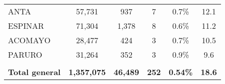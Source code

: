 \begin{tabular}{lccccc}
	\cellcolor[HTML]{FFFF99}ANTA                                    & 57,731               & 937                                  & 7                    & 0.7\%                      & 12.1                                        \\
	\cellcolor[HTML]{FFFF99}ESPINAR                                 & 71,304               & 1,378                                & 8                    & 0.6\%                      & 11.2                                        \\
	\cellcolor[HTML]{FFFF99}ACOMAYO                                 & 28,477               & 424                                  & 3                    & 0.7\%                      & 10.5                                        \\
	\cellcolor[HTML]{FFFF99}PARURO                                  & 31,264               & 352                                  & 3                    & 0.9\%                      & 9.6                                         \\
	& \multicolumn{1}{l}{} & \multicolumn{1}{l}{}                 & \multicolumn{1}{l}{} & \multicolumn{1}{l}{}       & \multicolumn{1}{l}{}                        \\
	\rowcolor[HTML]{DDEBF7} 
	\textbf{Total general}                                          & \textbf{1,357,075}   & \textbf{46,489}                      & \textbf{252}         & \textbf{0.54\%}            & \textbf{18.6}                              
\end{tabular}